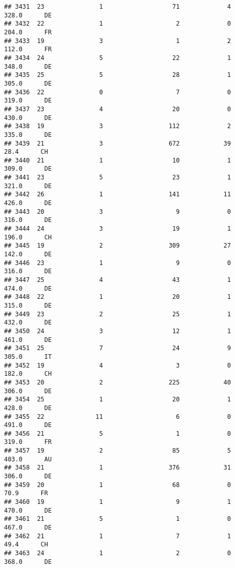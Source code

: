 \documentclass[
]{article}
\begin{document}
\begin{verbatim}
## 3431  23               1                   71             4    328.0      DE
## 3432  22               1                    2             0    204.0      FR
## 3433  19               3                    1             2    112.0      FR
## 3434  24               5                   22             1    348.0      DE
## 3435  25               5                   28             1    305.0      DE
## 3436  22               0                    7             0    319.0      DE
## 3437  23               4                   20             0    430.0      DE
## 3438  19               3                  112             2    335.0      DE
## 3439  21               3                  672            39     28.4      CH
## 3440  21               1                   10             1    309.0      DE
## 3441  23               5                   23             1    321.0      DE
## 3442  26               1                  141            11    426.0      DE
## 3443  20               3                    9             0    316.0      DE
## 3444  24               3                   19             1    196.0      CH
## 3445  19               2                  309            27    142.0      DE
## 3446  23               1                    9             0    316.0      DE
## 3447  25               4                   43             1    474.0      DE
## 3448  22               1                   20             1    315.0      DE
## 3449  23               2                   25             1    432.0      DE
## 3450  24               3                   12             1    461.0      DE
## 3451  25               7                   24             9    305.0      IT
## 3452  19               4                    3             0    182.0      CH
## 3453  20               2                  225            40    306.0      DE
## 3454  25               1                   20             1    428.0      DE
## 3455  22              11                    6             0    491.0      DE
## 3456  21               5                    1             0    319.0      FR
## 3457  19               2                   85             5    403.0      AU
## 3458  21               1                  376            31    306.0      DE
## 3459  20               1                   68             0     70.9      FR
## 3460  19               1                    9             1    470.0      DE
## 3461  21               5                    1             0    467.0      DE
## 3462  21               1                    7             1     49.4      CH
## 3463  24               1                    2             0    368.0      DE

\end{verbatim}
\end{document}
